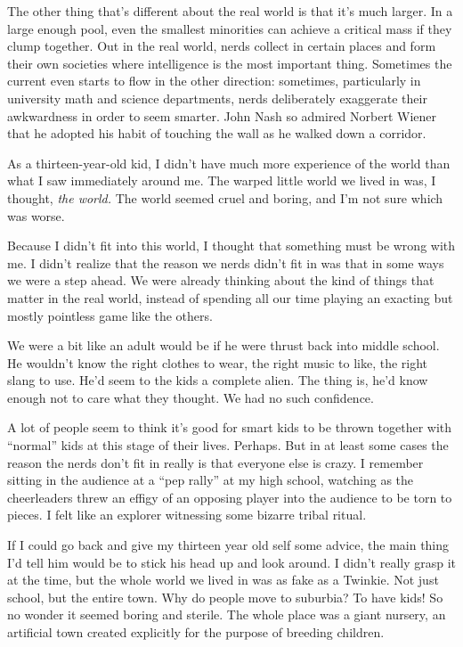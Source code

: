 \documentclass[12pt]{book}
\begin{document}
The other thing that's different about the real world is that it's much
larger. In a large enough pool, even the smallest minorities can achieve
a critical mass if they clump together. Out in the real world, nerds
collect in certain places and form their own societies where
intelligence is the most important thing. Sometimes the current even
starts to flow in the other direction: sometimes, particularly in
university math and science departments, nerds deliberately exaggerate
their awkwardness in order to seem smarter. John Nash so admired Norbert
Wiener that he adopted his habit of touching the wall as he walked down
a corridor.

As a thirteen-year-old kid, I didn't have much more experience of the
world than what I saw immediately around me. The warped little world we
lived in was, I thought, \emph{the world.} The world seemed cruel and
boring, and I'm not sure which was worse.

Because I didn't fit into this world, I thought that something must be
wrong with me. I didn't realize that the reason we nerds didn't fit in
was that in some ways we were a step ahead. We were already thinking
about the kind of things that matter in the real world, instead of
spending all our time playing an exacting but mostly pointless game like
the others.

We were a bit like an adult would be if he were thrust back into middle
school. He wouldn't know the right clothes to wear, the right music to
like, the right slang to use. He'd seem to the kids a complete alien.
The thing is, he'd know enough not to care what they thought. We had no
such confidence.

A lot of people seem to think it's good for smart kids to be thrown
together with ``normal'' kids at this stage of their lives. Perhaps. But
in at least some cases the reason the nerds don't fit in really is that
everyone else is crazy. I remember sitting in the audience at a ``pep
rally'' at my high school, watching as the cheerleaders threw an effigy
of an opposing player into the audience to be torn to pieces. I felt
like an explorer witnessing some bizarre tribal ritual.

If I could go back and give my thirteen year old self some advice, the
main thing I'd tell him would be to stick his head up and look around. I
didn't really grasp it at the time, but the whole world we lived in was
as fake as a Twinkie. Not just school, but the entire town. Why do
people move to suburbia? To have kids! So no wonder it seemed boring and
sterile. The whole place was a giant nursery, an artificial town created
explicitly for the purpose of breeding children.
\end{document}
